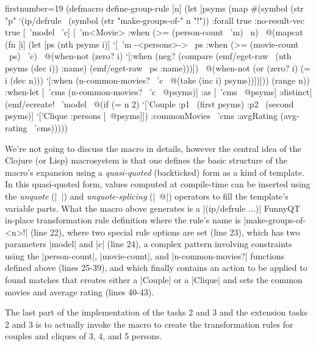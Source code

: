 \documentclass[a4paper]{article}
\newcommand{\code}{\clojureinline}
\begin{document}
\begin{clojurecode*}{firstnumber=19}
(defmacro define-group-rule [n]
  (let [psyms (map #(symbol (str "p" %
    `(ip/defrule ~(symbol (str "make-groups-of-" n "!"))
       {:forall true :no-result-vec true}
       [~'model ~'c]
       [~'m<Movie>
        :when (>= (person-count ~'m) ~n)
        ~@(mapcat (fn [i]
                    (let [ps (nth psyms i)]
                      `[~'m -<persons>-> ~ps
                        :when (>= (movie-count ~ps) ~'c)
                        ~@(when-not (zero? i)
                            `[:when (neg? (compare (emf/eget-raw ~(nth psyms (dec i)) :name)
                                                   (emf/eget-raw ~ps :name)))])
                        ~@(when-not (or (zero? i) (= i (dec n)))
                            `[:when (n-common-movies? ~'c ~@(take (inc i) psyms))])]))
                  (range n))
        :when-let [~'cms (n-common-movies? ~'c ~@psyms)]
        :as [~'cms ~@psyms]
        :distinct]
       (emf/ecreate! ~'model ~@(if (= n 2)
                                 `['Couple :p1 ~(first psyms) :p2 ~(second psyms)]
                                 `['Clique :persons [~@psyms]])
                     :commonMovies ~'cms :avgRating (avg-rating ~'cms)))))
\end{clojurecode*}

We're not going to discuss the macro in details, however the central idea of
the Clojure (or Lisp) macrosystem is that one defines the basic structure of
the macro's expansion using a \emph{quasi-quoted} (backticked) form as a kind
of template.  In this quasi-quoted form, values computed at compile-time can be
inserted using the \emph{unquote} (\code|~|) and \emph{unquote-splicing}
(\code|~@|) operators to fill the template's variable parts.  What the macro
above generates is a \code|(ip/defrule ...)| FunnyQT in-place transformation
rule definition where the rule's name is \code|make-groups-of-<n>!| (line 22),
where two special rule options are set (line 23), which has two parameters
\code|model| and \code|c| (line 24), a complex pattern involving constraints
using the \code|person-count|, \code|movie-count|, and \code|n-common-movies?|
functions defined above (lines 25-39), and which finally contains an action to
be applied to found matches that creates either a \code|Couple| or a
\code|Clique| and sets the common movies and average rating (lines 40-43).

The last part of the implementation of the tasks 2 and 3 and the extension
tasks 2 and 3 is to actually invoke the macro to create the transformation
rules for couples and cliques of 3, 4, and 5 persons.
\end{document}
